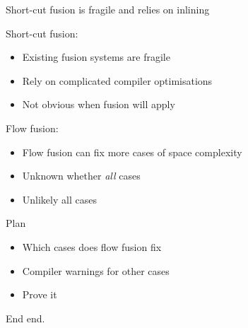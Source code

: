 \documentclass[t]{beamer}
\begin{document}
\begin{frame}[fragile]{Short-cut fusion is fragile and relies on inlining}

 Short-cut fusion:
\begin{itemize}
\item Existing fusion systems are fragile
\item Rely on complicated compiler optimisations
\item Not obvious when fusion will apply
\end{itemize}
Flow fusion:
\begin{itemize}
\item Flow fusion can fix more cases of space complexity
\item Unknown whether \emph{all} cases
\item Unlikely all cases
\end{itemize}

\end{frame}

\begin{frame}[fragile]{Plan}

\begin{itemize}
\item Which cases does flow fusion fix
\item Compiler warnings for other cases
\item Prove it
\end{itemize}

\end{frame}

\begin{frame}[fragile]{End}
end.
\end{frame}
\end{document}
